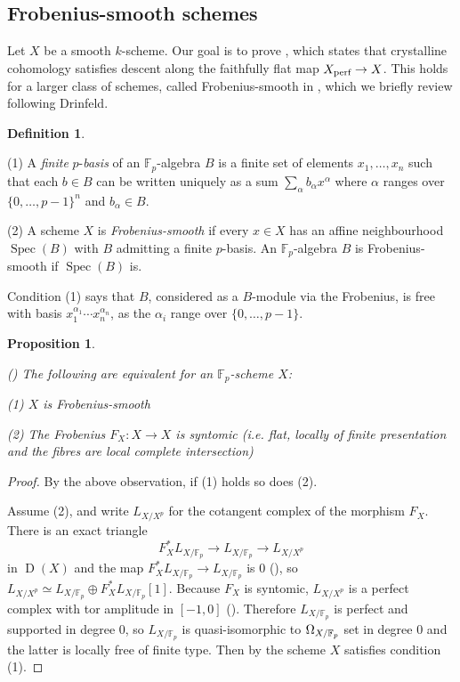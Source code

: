 \documentclass[11pt]{article}
\theoremstyle{plain}
\newtheorem{Prop}[Thm]{Proposition}
\theoremstyle{definition}
\newtheorem{Def}[Thm]{Definition}
\theoremstyle{remark}
\numberwithin{equation}{section}
\newcommand{\ssec}[2]{\subsection{#2}\label{SubS:#1}}
\newenvironment{propos}[1]%
    { \begin{Prop} \label{P:#1}}%
    { \end{Prop} }
\newcommand{\prop}[1]{\begin{propos}{#1}\sl }
\newcommand{\eprop}{\end{propos}}
\newenvironment{defeni}[1]%
    { \begin{Def} \label{D:#1}}%
    { \end{Def} }
\newcommand{\defe}[1]{\begin{defeni}{#1} }
\newcommand{\edefe}{\end{defeni}}
\newcommand{\prf}{ \begin{proof} }
\newcommand{\epr}{ \end{proof} }
\newcommand{\Fp}{\mathbb{F}_p}
\DeclareMathOperator{\D}{D}                                              %
\DeclareMathOperator{\Spec}{Spec}                                        %
\newcommand{\Ll}{L}                                                      %
\newcommand\coperf[1]{#1_{\textnormal{perf}}}                            %
\begin{document}




\ssec{frobeniussmooth}{Frobenius-smooth schemes}

Let $X$ be a smooth $k$-scheme. Our goal is to prove , which states that crystalline cohomology satisfies descent along the faithfully flat map $\coperf{X}\to X$. This holds for a larger class of schemes, called Frobenius-smooth in \cite{drinfeldstacky}, which we briefly review following Drinfeld.

\defe{pbase}

(1) A \textit{finite} $p$-\textit{basis} of an $\Fp$-algebra $B$ is a finite set of elements $x_1,\dotsc,x_n$ such that each $b\in B$ can be written uniquely as a sum $\sum_{\alpha}b_{\alpha}x^{\alpha}$ where $\alpha$ ranges over $\{0,\dotsc,p-1\}^n$ and $b_{\alpha}\in B$.

(2) A scheme $X$ is \textit{Frobenius-smooth} if every $x\in X$ has an affine neighbourhood $\Spec(B)$ with $B$ admitting a finite $p$-basis. An $\Fp$-algebra $B$ is Frobenius-smooth if $\Spec(B)$ is.

\edefe

Condition (1) says that $B$, considered as a $B$-module via the Frobenius, is free with basis $x_1^{\alpha_1}\dotsm x_n^{\alpha_n}$, as the $\alpha_i$ range over $\{0,\dotsc,p-1\}$. 

\prop{frobsintomico}

(\cite[Lemma 2.1.1]{drinfeldstacky}) The following are equivalent for an $\Fp$-scheme $X$:

(1) $X$ is Frobenius-smooth

(2) The Frobenius $F_X:X\to X$ is syntomic (i.e. flat, locally of finite presentation and the fibres are local complete intersection)

\eprop

\prf

By the above observation, if (1) holds so does (2).

Assume (2), and write $L_{X/X^p}$ for the cotangent complex of the morphism $F_X$. There is an exact triangle
$$
F_X^*\Ll_{X/\Fp}\to\Ll_{X/\Fp}\to\Ll_{X/X^p}
$$
in $\D(X)$ and the map $F_X^*\Ll_{X/\Fp}\to\Ll_{X/\Fp}$ is $0$ (\cite[Tag 0G5Z]{stacksproject}), so $L_{X/X^p}\simeq L_{X/\Fp}\oplus F_X^*L_{X/\Fp}[1]$. Because $F_X$ is syntomic, $L_{X/X^p}$ is a perfect complex with tor amplitude in $[-1,0]$ (\cite[Tag 08SL]{stacksproject}). Therefore $L_{X/\Fp}$ is perfect and supported in degree $0$, so $L_{X/\Fp}$ is quasi-isomorphic to $\Ome_{X/\Fp}$ set in degree $0$ and the latter is locally free of finite type. Then by \cite[Proposition 3.6]{pbasi} the scheme $X$ satisfies condition (1).\epr
\end{document}
